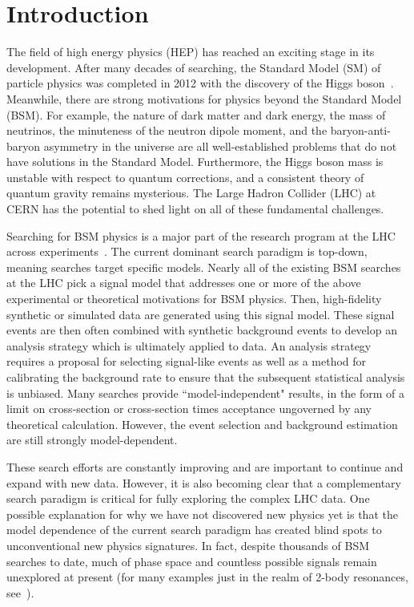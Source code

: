 \documentclass[a4paper,11pt]{article}
\begin{document}
\clearpage

\section{Introduction}
\label{sec:intro}


The field of high energy physics (HEP) has reached an exciting stage in its development.  After many decades of searching, the Standard Model (SM) of particle physics was completed in 2012 with the discovery of the Higgs boson~\cite{Aad:2012tfa,Chatrchyan:2012ufa}.
Meanwhile, there are strong motivations for physics beyond the Standard Model (BSM).  For example, the nature of dark matter and dark energy, the mass of neutrinos, the minuteness of the neutron dipole moment, and the baryon-anti-baryon asymmetry in the universe are all well-established problems that do not have solutions in the Standard Model.  Furthermore, the Higgs boson mass is unstable with respect to quantum corrections, and a consistent theory of quantum gravity remains mysterious. The Large Hadron Collider (LHC) at CERN has the potential to shed light on all of these fundamental challenges.

Searching for BSM physics is a major part of the research program at the LHC across experiments~\cite{atlasexoticstwiki,atlassusytwiki,atlashdbspublictwiki,cmsexoticstwiki,cmssusytwiki,cmsb2gtwiki,lhcbtwiki}. The current dominant search paradigm is top-down, meaning searches target specific models. Nearly all of the existing BSM searches at the LHC pick a signal model that addresses one or more of the above experimental or theoretical motivations for BSM physics.  Then, high-fidelity synthetic or simulated data are generated using this signal model.  These signal events are then often combined with synthetic background events to develop an analysis strategy which is ultimately applied to data.  An analysis strategy requires a proposal for selecting signal-like events as well as a method for calibrating the background rate to ensure that the subsequent statistical analysis is unbiased. Many searches provide ``model-independent" results, in the form of a limit on cross-section or cross-section times acceptance ungoverned by any theoretical calculation. However, the event selection and background estimation are still strongly model-dependent.

These search efforts are constantly improving and are important to continue and expand with new data.  However, it is also becoming clear that a complementary search paradigm is critical for fully exploring the complex LHC data.  One possible explanation for why we have not discovered new physics yet is that the model dependence of the current search paradigm has created blind spots to unconventional new physics signatures. In fact, despite thousands of BSM searches to date, much of phase space and countless possible signals remain unexplored at present (for many examples just in the realm of 2-body resonances, see~\cite{Craig:2016rqv,1907.06659}). 
\end{document}
